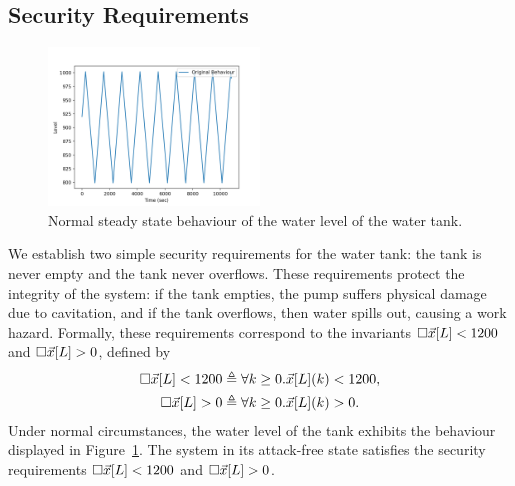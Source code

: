 \subsection*{Security Requirements}
 \begin{figure}
  \centering
  \includegraphics[width=0.5\textwidth]{Figures/Stage3Normal.png}
  \caption{Normal steady state behaviour of the water level of the water tank.}
  \label{fig:CPSRobustness:Stage3Normal}
 \end{figure}
We establish two simple security requirements for the water tank: the tank is never empty and the tank never overflows. These requirements protect the integrity of the system: if the tank empties, the pump suffers physical damage due to cavitation, and if the tank overflows, then water spills out, causing a work hazard. Formally, these requirements correspond to the invariants ${{\square}}{\vec{x}[L]< 1200}$ and ${{\square}}{\vec{x}[L]> 0}$, defined by
  \begin{align*}
    {{\square}}{\vec{x}[L]< 1200}&\triangleq \forall k\geq0.\vec{x}[L](k)< 1200,\\
    {{\square}}{\vec{x}[L]> 0}&\triangleq \forall k\geq0.\vec{x}[L](k)> 0.
  \end{align*}
Under normal circumstances, the water level of the tank exhibits the behaviour displayed in Figure~\ref{fig:CPSRobustness:Stage3Normal}. The system in its attack-free state satisfies the security requirements ${{\square}}{\vec{x}[L]< 1200}$ and ${{\square}}{\vec{x}[L]> 0}$.
